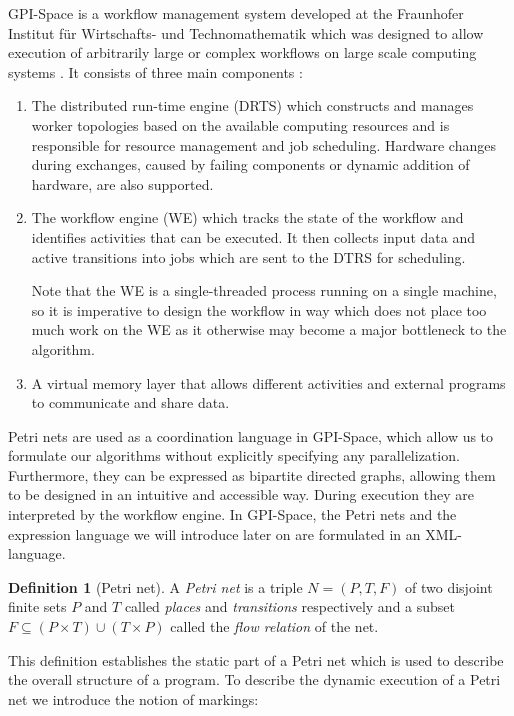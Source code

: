 \documentclass[
  paper=a4,
  titlepage,
  bibliography=totoc,
  pagesize=pdftex
]{scrartcl}
\numberwithin{figure}{section}
\numberwithin{equation}{section}
\numberwithin{table}{section}
\theoremstyle{definition}
\newtheorem{definition}{Definition}
\numberwithin{definition}{section}
\begin{document}
GPI-Space is a workflow management system developed at the Fraunhofer Institut für
Wirtschafts- und Technomathematik which was designed to allow execution of arbitrarily
large or complex workflows on large scale computing systems \cite{gpispace}. It consists
of three main components \cite[Section~4.1]{reinboldGitFan}:
\begin{enumerate}[label=\arabic*.]
  \item The distributed run-time engine (DRTS) which constructs and manages worker
    topologies based on the available computing resources and is responsible for resource
    management and job scheduling. Hardware changes during exchanges, caused by failing
    components or dynamic addition of hardware, are also supported.
  \item The workflow engine (WE) which tracks the state of the workflow and identifies
    activities that can be executed. It then collects input data and active transitions
    into jobs which are sent to the DTRS for scheduling.

    Note that the WE is a single-threaded process running on a single machine, so it is
    imperative to design the workflow in way which does not place too much work on the WE
    as it otherwise may become a major bottleneck to the algorithm.
  \item A virtual memory layer that allows different activities and external programs to
    communicate and share data.
\end{enumerate}

Petri nets are used as a coordination language in GPI-Space, which allow us to formulate
our algorithms without explicitly specifying any parallelization. Furthermore, they can be
expressed as bipartite directed graphs, allowing them to be designed in an intuitive and
accessible way. During execution they are interpreted by the workflow engine. In
GPI-Space, the Petri nets and the expression language we will introduce later on are
formulated in an XML-language.

\begin{definition}[Petri net]
  \label{def:petri}
  A \emph{Petri net} is a triple $N = (P, T, F)$ of two disjoint finite sets $P$ and $T$
  called \emph{places} and \emph{transitions} respectively and a subset $F \subseteq
  (P\times T) \cup (T \times P)$ called the \emph{flow relation} of the net.
\end{definition}

This definition establishes the static part of a Petri net which is used to describe the
overall structure of a program. To describe the dynamic execution of a Petri net we
introduce the notion of markings:
\end{document}
